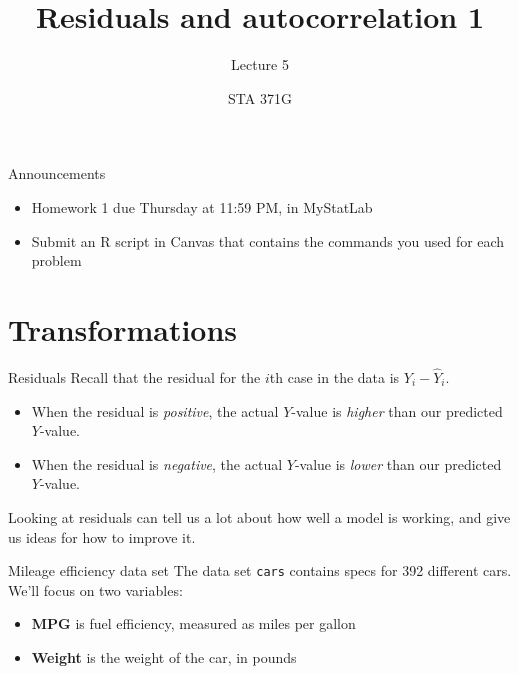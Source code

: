 \documentclass{beamer}\usepackage[]{graphicx}\usepackage[]{color}
\title{Residuals and autocorrelation 1}
\subtitle{Lecture 5}
\author{STA 371G}
\begin{document}
  
  

  \frame{\maketitle}



  \begin{darkframes}
    \begin{frame}{Announcements}
      \begin{itemize}
        \item Homework 1 due Thursday at 11:59 PM, in MyStatLab
        \item Submit an R script in Canvas that contains the commands you used for each problem
      \end{itemize}
    \end{frame}

    \section{Transformations}

    \begin{frame}{Residuals}
      Recall that the \alert{residual} for the $i$th case in the data is $Y_i - \hat Y_i$.

      \begin{itemize}
        \item When the residual is \emph{positive}, the actual $Y$-value is \emph{higher} than our predicted $Y$-value.
        \item When the residual is \emph{negative}, the actual $Y$-value is \emph{lower} than our predicted $Y$-value.
      \end{itemize}

      \bigskip

      Looking at residuals can tell us a lot about how well a model is working, and give us ideas for how to improve it.
    \end{frame}

    \begin{frame}{Mileage efficiency data set}
      The data set \texttt{cars} contains specs for 392 different cars. We'll focus on two variables:
      \begin{itemize}
        \item \textbf{MPG} is fuel efficiency, measured as miles per gallon
        \item \textbf{Weight} is the weight of the car, in pounds
      \end{itemize}
    \end{frame}


\end{darkframes}
\end{document}
